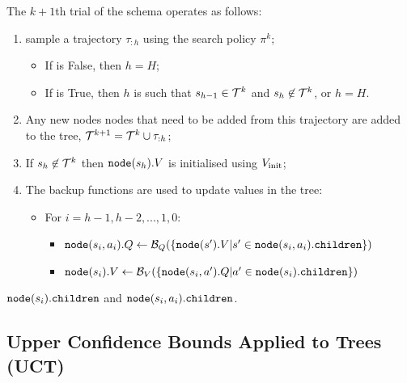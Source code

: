         The $k+1$th trial of the \thtspp\ewe schema operates as follows: 
        \begin{enumerate}
            \item sample a trajectory $\tau_{:h}$ using the search policy $\pi^{k}$;
            \begin{itemize}
                \item If \mctsmode\ewe is False, then $h=H$;
                \item If \mctsmode\ewe is True, then $h$ is such that $s_{h-1}\in\mathcal{T}^k$ and $s_h\not\in\mathcal{T}^k$, or $h=H$.
            \end{itemize}
            \item Any new nodes nodes that need to be added from this trajectory are added to the tree, $\mathcal{T}^{k+1} = \mathcal{T}^k \cup \tau_{:h}$;
            \item If $s_h\not\in\mathcal{T}^k$ then ${\textnormal{\texttt{node}}}(s_h).V$ is initialised using $V_{\text{init}}$;
            \item The backup functions are used to update values in the tree:
            \begin{itemize}
                \item For $i={h-1,h-2,...,1,0}$:
                \begin{itemize}
                    \item ${\textnormal{\texttt{node}}}(s_i,a_i).Q \leftarrow \mathcal{B}_Q(\{{\textnormal{\texttt{node}}}(s').V | s'\in{\textnormal{\texttt{node}}}(s_i,a_i).{\textnormal{\texttt{children}}}\})$
                    \item ${\textnormal{\texttt{node}}}(s_i).V \leftarrow \mathcal{B}_V(\{{\textnormal{\texttt{node}}}(s_i,a').Q | a'\in{\textnormal{\texttt{node}}}(s_i).{\textnormal{\texttt{children}}}\})$
                \end{itemize}
            \end{itemize}
        \end{enumerate}

         ${\textnormal{\texttt{node}}}(s_i).{\textnormal{\texttt{children}}}$ and ${\textnormal{\texttt{node}}}(s_i,a_i).{\textnormal{\texttt{children}}}$.



    

    
    \subsection{Upper Confidence Bounds Applied to Trees (UCT)}
    \label{sec:2-2-2-uct}
    
